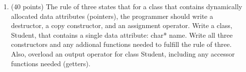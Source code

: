 \documentclass[times, 11pt]{article}
\begin{document}
\begin{enumerate}


\newpage

\item
(40 points)
The {\sf rule of three} states that for a class that contains
dynamically allocated data attributes (pointers), the programmer
should write a destructor, a copy constructor, and an assignment
operator.
Write a class, {\sf Student}, that contains a single data attribute:
{\sf char* name}.
Write all three constructors and any addional functions needed to
fulfill the {\sf rule of three}. 
Also, overload an output operator for class {\sf Student}, including
any accessor functions needed (getters).

\end{enumerate}


\end{document}
